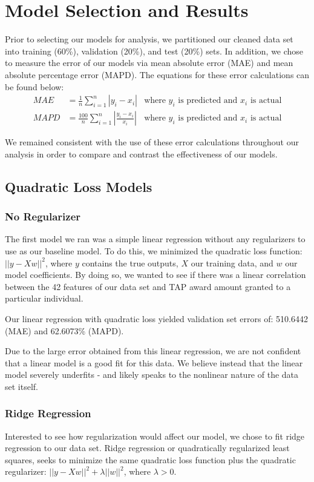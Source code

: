 \documentclass[12pt, fleqn]{article}
\begin{document}
\section{Model Selection and Results}
Prior to selecting our models for analysis, we partitioned our cleaned data set into training (60\%), validation (20\%), and test (20\%) sets. In addition, we chose to measure the error of our models via mean absolute error (MAE) and mean absolute percentage error (MAPD). The equations for these error calculations can be found below:
\begin{align*}
	MAE &= \tfrac{1}{n} \sum_{i=1}^{n} |y_i - x_i| & \text{where $y_i$ is predicted and $x_i$ is actual} \\
	MAPD &= \tfrac{100}{n} \sum_{i=1}^{n} |\tfrac{y_i - x_i}{x_i}| & \text{where $y_i$ is predicted and $x_i$ is actual}
\end{align*}

We remained consistent with the use of these error calculations throughout our analysis in order to compare and contrast the effectiveness of our models.


\subsection{Quadratic Loss Models}
\subsubsection{No Regularizer}
	The first model we ran was a simple linear regression without any regularizers to use as our baseline model. To do this, we minimized the quadratic loss function: $|| y - Xw ||^2$, where $y$ contains the true outputs, $X$ our training data, and $w$ our model coefficients. By doing so, we wanted to see if there was a linear correlation between the 42 features of our data set and TAP award amount granted to a particular individual.

	Our linear regression with quadratic loss yielded validation set errors of: 510.6442 (MAE) and 62.6073\% (MAPD). 

	Due to the large error obtained from this linear regression, we are not confident that a linear model is a good fit for this data. We believe instead that the linear model severely underfits - and likely speaks to the nonlinear nature of the data set itself.


\subsubsection{Ridge Regression}
	Interested to see how regularization would affect our model, we chose to fit ridge regression to our data set. Ridge regression or quadratically regularized least squares, seeks to minimize the same quadratic loss function plus the quadratic regularizer: $|| y - Xw ||^2 + \lambda ||w||^2$, where $\lambda > 0$. 
\end{document}

